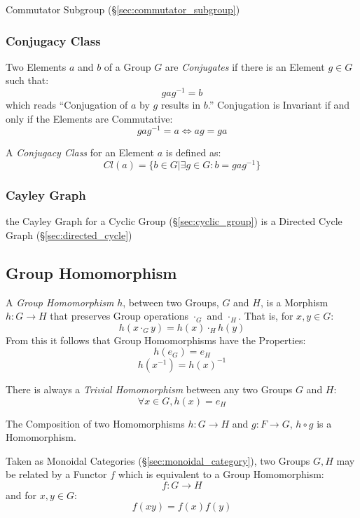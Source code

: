 Commutator Subgroup (\S\ref{sec:commutator_subgroup})



\subsubsection{Conjugacy Class}\label{sec:conjugacy_class}

Two Elements $a$ and $b$ of a Group $G$ are \emph{Conjugates} if there
is an Element $g \in G$ such that:
\[
    gag^{-1} = b
\]
which reads ``Conjugation of $a$ by $g$ results in $b$.'' Conjugation
is Invariant if and only if the Elements are Commutative:
\[
    gag^{-1} = a \Leftrightarrow ag = ga
\]

A \emph{Conjugacy Class} for an Element $a$ is defined as:
\[
    Cl(a) = \{ b \in G | \exists g \in G : b = gag^{-1}\}
\]



\subsubsection{Cayley Graph}\label{sec:cayley_graph}

the Cayley Graph for a Cyclic Group (\S\ref{sec:cyclic_group}) is a
Directed Cycle Graph (\S\ref{sec:directed_cycle})



\subsection{Group Homomorphism}\label{sec:group_homomorphism}

A \emph{Group Homomorphism} $h$, between two Groups, $G$ and $H$, is a
Morphism $h : G \rightarrow H$ that preserves Group operations
$\cdot_G$ and $\cdot_H$. That is, for $x,y \in G$:
\[
    h(x \cdot_G y) = h(x) \cdot_H h(y)
\]
From this it follows that Group Homomorphisms have the Properties:
\[
    h(e_G) = e_H
\]\[
    h(x^{-1}) = h(x)^{-1}
\]

There is always a \emph{Trivial Homomorphism} between any two Groups
$G$ and $H$:
\[
    \forall x \in G, h (x) = e_H
\]

The Composition of two Homomorphisms $h : G \rightarrow H$ and $g : F
\rightarrow G$, $h \circ g$ is a Homomorphism.

Taken as Monoidal Categories (\S\ref{sec:monoidal_category}), two
Groups $G, H$ may be related by a Functor $f$ which is equivalent to a
Group Homomorphism:
\[
    f : G \rightarrow H
\]
and for $x,y \in G$:
\[
    f(xy) = f(x)f(y)
\]



